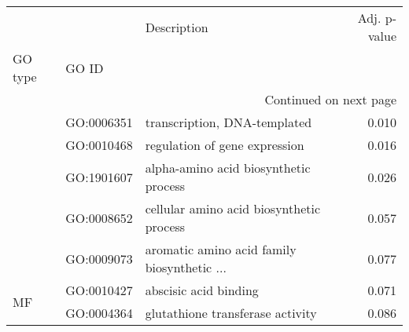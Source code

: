 \begin{longtable}{lllr}
\toprule
   &            &                                  Description &  Adj. p-value \\
GO type & GO ID &                                              &               \\
\midrule
\endhead
\midrule
\multicolumn{4}{r}{{Continued on next page}} \\
\midrule
\endfoot

\bottomrule
\endlastfoot
\multirow{5}{*}{BP} & GO:0006351 &                 transcription, DNA-templated &         0.010 \\
   & GO:0010468 &                regulation of gene expression &         0.016 \\
   & GO:1901607 &        alpha-amino acid biosynthetic process &         0.026 \\
   & GO:0008652 &     cellular amino acid biosynthetic process &         0.057 \\
   & GO:0009073 &  aromatic amino acid family biosynthetic ... &         0.077 \\
\cline{1-4}
\multirow{2}{*}{MF} & GO:0010427 &                        abscisic acid binding &         0.071 \\
   & GO:0004364 &             glutathione transferase activity &         0.086 \\
\end{longtable}
